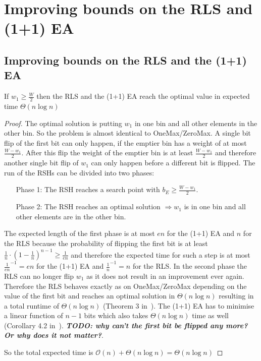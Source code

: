 \chapter{Improving bounds on the RLS and (1+1) EA}
\label{ch:Content1}

\section{Improving bounds on the RLS and the (1+1) EA}
\begin{theorem}\label{theo:OneMaxResult}
    If $w_1 \ge \frac W 2$  then the RLS and the (1+1) EA reach the optimal value in expected time $\Theta(n\log{}n)$
\end{theorem}
\begin{proof}
    The optimal solution is putting $w_1$ in one bin and all other elements in the other bin.
    So the problem is almost identical to OneMax/ZeroMax.
    A single bit flip of the first bit can only happen, if the emptier bin has a weight of at most $\frac {W-w_1}{2}$.
    After this flip the weight of the emptier bin is at least $\frac {W-w_1}{2}$ and therefore another single bit flip of $w_1$ can only happen before a different bit is flipped.
    The run of the RSHs can be divided into two phases:
    \begin{itemize}
        \item[Phase 1:] The RSH reaches a search point with $b_E \ge \frac {W-w_1}{2}$.
        \item[Phase 2:] The RSH reaches an optimal solution $\Rightarrow w_1$ is in one bin and all other elements are in the other bin.
    \end{itemize}

    The expected length of the first phase is at most $en$ for the (1+1) EA and $n$ for the RLS because the probability of flipping the first bit is at least ${\frac{1}{n}} \cdot {(1 - \frac{1}{n})}^{n-1} \ge \frac{1}{en}$ and therefore the expected time for such a step is at most $\frac{1}{en}^{-1} = en$ for the (1+1) EA and $\frac{1}{n}^{-1}=n$ for the RLS.\newline
    In the second phase the RLS can no longer flip $w_1$ as it does not result in an improvement ever again.
    Therefore the RLS behaves exactly as on OneMax/ZeroMax depending on the value of the first bit and reaches an optimal solution in $\Theta(n\log{}n)$ resulting in a total runtime of $\Theta(n\log{}n)$ (Theorem 3 in~\cite{witt2014fitness}).
    The (1+1) EA has to minimise a linear function of $n-1$ bits which also takes $\Theta(n\log{}n)$ time as well (Corollary 4.2 in~\cite{witt2013tight}).
    \textbf{\textit{TODO: why can't the first bit be flipped any more? Or why does it not matter?}}.

    So the total expected time is $\mathcal{O}(n) + \Theta(n\log{}n) = \Theta(n\log{}n)$
\end{proof}

